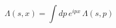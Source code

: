 \begin{equation*}
\Lambda \left( s,x\right) =\int dp\,e^{ipx}\,\Lambda \left( s,p\right) 
\end{equation*}

